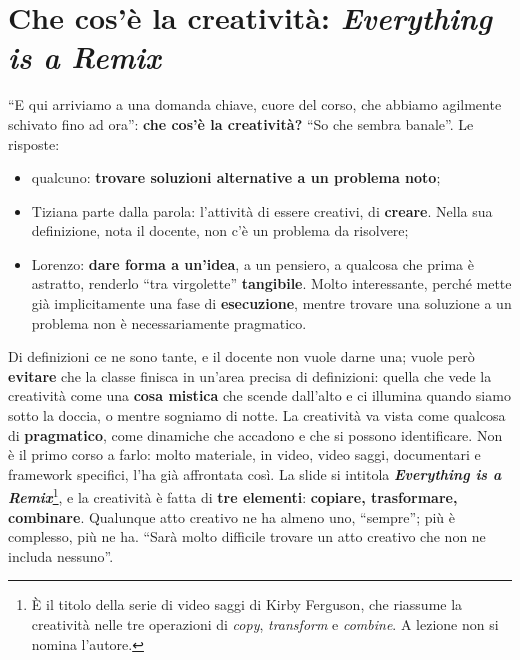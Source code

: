 \section{Che cos'è la creatività: \emph{Everything is a Remix}}
\label{a6:sec:creativita}



``E qui arriviamo a una domanda chiave, cuore del corso, che abbiamo agilmente schivato
fino ad ora'': \textbf{che cos'è la creatività?} ``So che sembra banale''. Le
risposte:
\begin{itemize}
  \item qualcuno: \textbf{trovare soluzioni alternative a un problema noto};
  \item Tiziana parte dalla parola: l'attività di essere creativi, di
        \textbf{creare}. Nella sua definizione, nota il docente, non c'è un problema
        da risolvere;
  \item Lorenzo: \textbf{dare forma a un'idea}, a un pensiero, a qualcosa che prima è
        astratto, renderlo ``tra virgolette'' \textbf{tangibile}. Molto interessante,
        perché mette già implicitamente una fase di \textbf{esecuzione}, mentre
        trovare una soluzione a un problema non è necessariamente pragmatico.
\end{itemize}

Di definizioni ce ne sono tante, e il docente non vuole darne una; vuole però
\textbf{evitare} che la classe finisca in un'area precisa di definizioni: quella che
vede la creatività come una \textbf{cosa mistica} che scende dall'alto e ci illumina
quando siamo sotto la doccia, o mentre sogniamo di notte. La creatività va vista come
qualcosa di \textbf{pragmatico}, come dinamiche che accadono e che si possono
identificare. Non è il primo corso a farlo: molto materiale, in video, video saggi,
documentari e framework specifici, l'ha già affrontata così. La slide si intitola
\textbf{\emph{Everything is a Remix}}\footnote{È il titolo della serie di video
saggi di Kirby Ferguson, che riassume la creatività nelle tre operazioni di
\emph{copy}, \emph{transform} e \emph{combine}. A lezione non si nomina l'autore.}, e
la creatività è fatta di \textbf{tre elementi}: \textbf{copiare, trasformare,
combinare}. Qualunque atto creativo ne ha almeno uno, ``sempre''; più è complesso, più
ne ha. ``Sarà molto difficile trovare un atto creativo che non ne includa nessuno''.

